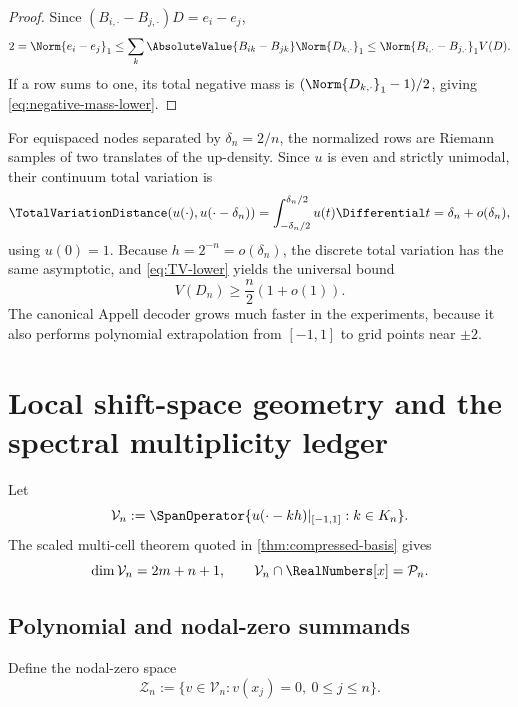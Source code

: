 \documentclass[11pt,oneside]{article}
\numberwithin{equation}{section}
\theoremstyle{definition}
\theoremstyle{remark}
\newcommand{\PiN}{\mathcal P}
\begin{document}
\begin{proof}
Since $(B_{i,\cdot}-B_{j,\cdot})D=e_i-e_j$,
\[
 2=\Norm{e_i-e_j}_1
 \le\sum_k\AbsoluteValue{B_{ik}-B_{jk}}\Norm{D_{k,\cdot}}_1
 \le\Norm{B_{i,\cdot}-B_{j,\cdot}}_1V(D).
\]
If a row sums to one, its total negative mass is
$(\Norm{D_{k,\cdot}}_1-1)/2$, giving \eqref{eq:negative-mass-lower}.
\end{proof}

For equispaced nodes separated by $\delta_n=2/n$, the normalized rows are
Riemann samples of two translates of the up-density.  Since $u$ is even and
strictly unimodal, their continuum total variation is
\begin{equation}
 \TotalVariationDistance(u(\cdot),u(\cdot-\delta_n))
 =\int_{-\delta_n/2}^{\delta_n/2}u(t)\Differential t
 =\delta_n+o(\delta_n),
 \label{eq:continuum-TV}
\end{equation}
using $u(0)=1$.  Because $h=2^{-n}=o(\delta_n)$, the discrete total variation
has the same asymptotic, and \eqref{eq:TV-lower} yields the universal bound
\begin{equation}
 V(D_n)\ge\frac n2(1+o(1)).
 \label{eq:linear-variation-lower}
\end{equation}
The canonical Appell decoder grows much faster in the experiments, because
it also performs polynomial extrapolation from $[-1,1]$ to grid points near
$\pm2$.

\section{Local shift-space geometry and the spectral multiplicity ledger}
\label{sec:geometry}

Let
\begin{equation}
 \mathcal V_n:=\SpanOperator\{u(\cdot-kh)|_{[-1,1]}:k\in K_n\}.
 \label{eq:Vn}
\end{equation}
The scaled multi-cell theorem quoted in \cref{thm:compressed-basis} gives
\begin{equation}
 \dim\mathcal V_n=2m+n+1,
 \qquad
 \mathcal V_n\cap\RealNumbers[x]=\PiN_n.
 \label{eq:V-dimension}
\end{equation}

\subsection{Polynomial and nodal-zero summands}

Define the nodal-zero space
\begin{equation}
 \mathcal Z_n:=\{v\in\mathcal V_n:v(x_j)=0,\ 0\le j\le n\}.
 \label{eq:Zn}
\end{equation}
\end{document}
